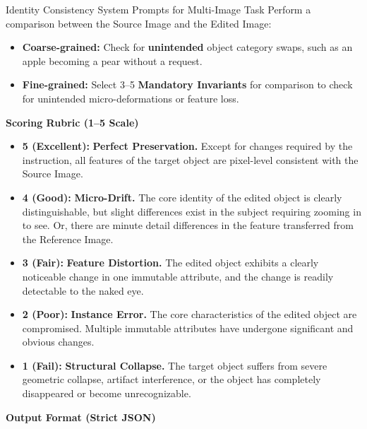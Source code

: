 \begin{promptbox}[label={System Prompts: IC_Multi-Image}]{Identity Consistency System Prompts for Multi-Image Task}
Perform a comparison between the Source Image and the Edited Image:

\begin{itemize}[leftmargin=2.2em, labelsep=0.5em, itemsep=2pt]
    \item \textbf{Coarse-grained:} Check for \textbf{unintended} object category swaps, such as an apple becoming a pear without a request.
    
    \item \textbf{Fine-grained:} Select 3--5 \textbf{Mandatory Invariants} for comparison to check for unintended micro-deformations or feature loss.
\end{itemize}

\medskip

\textbf{Scoring Rubric (1--5 Scale)}

\begin{itemize}[leftmargin=2.2em, labelsep=0.5em, itemsep=2pt]
    \item \textbf{5 (Excellent):} \textbf{Perfect Preservation.} Except for changes required by the instruction, all features of the target object are pixel-level consistent with the Source Image.
    
    \item \textbf{4 (Good):} \textbf{Micro-Drift.} The core identity of the edited object is clearly distinguishable, but slight differences exist in the subject requiring zooming in to see. Or, there are minute detail differences in the feature transferred from the Reference Image.
    
    \item \textbf{3 (Fair):} \textbf{Feature Distortion.} The edited object exhibits a clearly noticeable change in one immutable attribute, and the change is readily detectable to the naked eye.
    
    \item \textbf{2 (Poor):} \textbf{Instance Error.} The core characteristics of the edited object are compromised. Multiple immutable attributes have undergone significant and obvious changes.
    
    \item \textbf{1 (Fail):} \textbf{Structural Collapse.} The target object suffers from severe geometric collapse, artifact interference, or the object has completely disappeared or become unrecognizable.
\end{itemize}

\medskip

\textbf{Output Format (Strict JSON)}


\end{promptbox}
